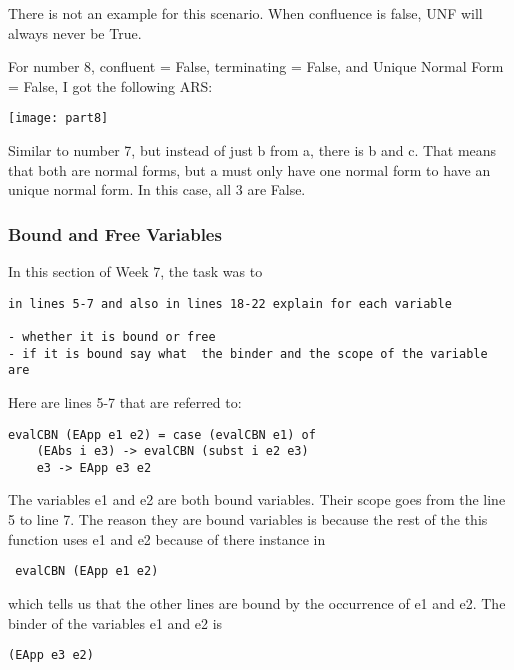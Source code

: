 \documentclass{article}
\theoremstyle{theorem}
\theoremstyle{definition}
\theoremstyle{remark}
\begin{document}
\noindent\newline There is not an example for this scenario. When confluence is false, UNF will always never be True.

\hrulefill

\noindent\newline\newline For number 8, confluent = False, terminating = False, and Unique Normal Form = False, I got the following ARS:

\texttt{[image: part8]}

\noindent\newline Similar to number 7, but instead of just b from a, there is b and c. That means that both are normal forms, but a must only have one normal form to have an unique normal form. In this case, all 3 are False.

\hrulefill

\subsubsection{Bound and Free Variables}
In this section of Week 7, the task was to 
\begin{verbatim}
in lines 5-7 and also in lines 18-22 explain for each variable

- whether it is bound or free
- if it is bound say what  the binder and the scope of the variable are
\end{verbatim}

\noindent\newline Here are lines 5-7 that are referred to: 
\begin{verbatim}
evalCBN (EApp e1 e2) = case (evalCBN e1) of
    (EAbs i e3) -> evalCBN (subst i e2 e3)
    e3 -> EApp e3 e2
\end{verbatim}

\noindent\newline The variables e1 and e2 are both bound variables. Their scope goes from the line 5 to line 7. The reason they are bound variables is because the rest of the this function uses e1 and e2 because of there instance in \begin{verbatim} evalCBN (EApp e1 e2) \end{verbatim}

\noindent which tells us that the other lines are bound by the occurrence of e1 and e2.
\noindent\newline\newline The binder of the variables e1 and e2 is
\begin{verbatim}
(EApp e3 e2)
\end{verbatim}
\end{document}
